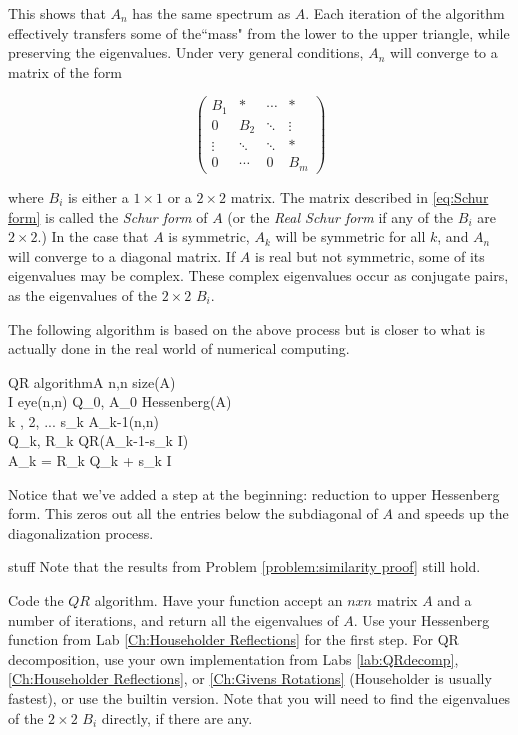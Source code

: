 This shows that $A_n$ has the same spectrum as $A$. Each iteration of the algorithm effectively transfers some of the``mass" from the lower to the upper triangle, while preserving the eigenvalues. Under very general conditions, $A_n$ will converge to a matrix of the form

\begin{equation}
\label{eq:Schur form}
     \begin{pmatrix}
          B_1 &* & \cdots & * \\
           0     &B_2  &  \ddots & \vdots \\
           \vdots  & \ddots & \ddots & *  \\
           0 & \cdots & 0 & B_m
    \end{pmatrix}
\end{equation}

where $B_i$ is either a $1 \times 1$ or a $2 \times 2$ matrix. The matrix described in \eqref{eq:Schur form} is called the \emph{Schur form} of $A$ (or the \emph{Real Schur form} if any of the $B_i$ are $2 \times 2$.) In the case that $A$ is symmetric, $A_k$ will be symmetric for all $k$, and $A_n$ will converge to a diagonal matrix. If $A$ is real but not symmetric, some of its eigenvalues may be complex. These complex eigenvalues occur as conjugate pairs, as the eigenvalues of the $2 \times 2$ $B_i$.

The following algorithm is based on the above process but is closer to what is actually done in the real world of numerical computing.

\begin{pseudo}{QR algorithm}{A}
\label{Alg:QR algorithm}
n,n \GETS size(A)\\
I \GETS eye(n,n)
Q_0, A_0 \GETS Hessenberg(A)\\
\FOR k , 2, ... \DO
\BEGIN
	s_k \GETS A_{k-1}(n,n)\\
	Q_k, R_k \GETS QR(A_{k-1}-s_k I)\\
	A_k = R_k Q_k + s_k I
\END
\end{pseudo}

Notice that we've added a step at the beginning: reduction to upper Hessenberg form. This zeros out all the entries below the subdiagonal of $A$ and speeds up the diagonalization process.

stuff
Note that the results from Problem \ref{problem:similarity proof} still hold.

\begin{problem}
Code the $QR$ algorithm. Have your function accept an $nxn$ matrix $A$ and a number of iterations, and return all the eigenvalues of $A$. Use your Hessenberg function from Lab \ref{Ch:Householder Reflections} for the first step. For QR decomposition, use your own implementation from Labs \ref{lab:QRdecomp}, \ref{Ch:Householder Reflections}, or \ref{Ch:Givens Rotations} (Householder is usually fastest), or use the builtin version. Note that you will need to find the eigenvalues of the $2 \times 2$ $B_i$ directly, if there are any.
\end{problem}

